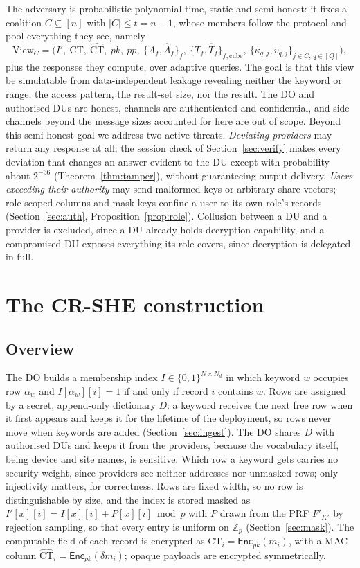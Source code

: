\documentclass[a4paper,fleqn]{cas-sc}
\newcommand{\Enc}{\mathsf{Enc}}
\begin{document}
The adversary is probabilistic polynomial-time, static and semi-honest: it
fixes a coalition $C\subseteq[n]$ with $|C|\le t=n-1$, whose members follow
the protocol and pool everything they see, namely
\[
\mathrm{View}_C = \big( I',\ \text{CT},\ \widehat{\text{CT}},\ pk,\ pp,\
\{A_f,\widehat{A}_f\}_f,\ \{T_f,\widehat{T}_f\}_{f,\text{cube}},\
\{\kappa_{q,j},v_{q,j}\}_{j\in C,\,q\in[Q]} \big),
\]
plus the responses they compute, over adaptive queries. The goal is that this
view be simulatable from data-independent leakage revealing neither the
keyword or range, the access pattern, the result-set size, nor the result. The
DO and authorised DUs are honest, channels are authenticated and confidential,
and side channels beyond the message sizes accounted for here are out of scope.
Beyond this semi-honest goal we address two active threats. \emph{Deviating
providers} may return any response at all; the session check of
Section~\ref{sec:verify} makes every deviation that changes an answer evident
to the DU except with probability about $2^{-36}$ (Theorem~\ref{thm:tamper}),
without guaranteeing output delivery. \emph{Users exceeding their authority}
may send malformed keys or arbitrary share vectors; role-scoped columns and
mask keys confine a user to its own role's records
(Section~\ref{sec:auth}, Proposition~\ref{prop:role}). Collusion between a DU
and a provider is excluded, since a DU already holds decryption capability,
and a compromised DU exposes everything its role covers, since decryption is
delegated in full.

\section{The CR-SHE construction}
\label{sec:construction}

\subsection{Overview}
The DO builds a membership index $I\in\{0,1\}^{N\times N_d}$ in which keyword
$w$ occupies row $\alpha_w$ and $I[\alpha_w][i]=1$ if and only if record $i$
contains $w$. Rows are assigned by a secret, append-only dictionary $D$: a
keyword receives the next free row when it first appears and keeps it for the
lifetime of the deployment, so rows never move when keywords are added
(Section~\ref{sec:ingest}). The DO shares $D$ with authorised DUs and keeps it
from the providers, because the vocabulary itself, being device and site
names, is sensitive. Which row a keyword gets carries no security weight,
since providers see neither addresses nor unmasked rows; only injectivity
matters, for correctness. Rows are fixed width, so no row is distinguishable
by size, and the index is stored masked as $I'[x][i]=I[x][i]+P[x][i]\bmod p$
with $P$ drawn from the PRF $F'_{K'}$ by rejection sampling, so that every
entry is uniform on $\mathbb{Z}_p$ (Section~\ref{sec:mask}).
The computable field of each record is encrypted as
$\text{CT}_i=\Enc_{pk}(m_i)$, with a MAC column
$\widehat{\text{CT}}_i=\Enc_{pk}(\delta m_i)$; opaque payloads are encrypted
symmetrically.
\end{document}
